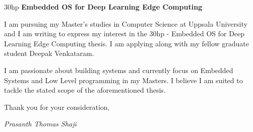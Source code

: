 \documentclass{article}
\begin{document}
{\LARGE 30hp \textbf{ Embedded OS for Deep Learning Edge Computing}}

{\Large I am pursuing my Master's studies in Computer Science at Uppsala University and I am writing to express my interest in the 30hp - Embedded OS for Deep Learning Edge Computing thesis. I am applying along with my fellow graduate student Deepak Venkataram.}

{\Large I am passionate about building systems and currently focus on Embedded Systems and Low Level programming in my Masters. I believe I am suited to tackle the stated scope of the aforementioned thesis.}

{\Large Thank you for your consideration,}

{\Large \textit{Prasanth Thomas Shaji}}
\end{document}
